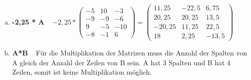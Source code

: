 \documentclass[10pt,ngerman]{scrartcl}
\begin{document}
\begin{enumerate}[1.]
\begin{enumerate}[(a)]
	 ~\newline~\newline
	 
	\item \textbf{-2,25 * A}\newline
	~\newline
	\begin{math}
	-2,25 * \begin{pmatrix}-5 & 10 & -3 \\ -9 & -9 & -6 \\ 9 & -5 & -10 \\ -8 & -1 & 6\end{pmatrix} = 
	\begin{pmatrix}11,25 & -22,5 & 6,75 \\ 20,25 & 20,25 & 13,5 \\-20,25 & 11,25 & 22,5 \\ 18 & 2,25 & -13,5\end{pmatrix}
	\end{math}
	 \newline~\newline
	 
	\item \textbf{A*B}\newline
	~\newline
	Für die Multiplikation der Matrizen muss die Anzahl der Spalten von A gleich der Anzahl der Zeilen von B sein. A hat 3 Spalten und B hat 4 Zeilen, somit ist keine Multiplikation möglich.
	
	 ~\newline~\newline
	 

\end{enumerate}
\end{enumerate}
\end{document}
